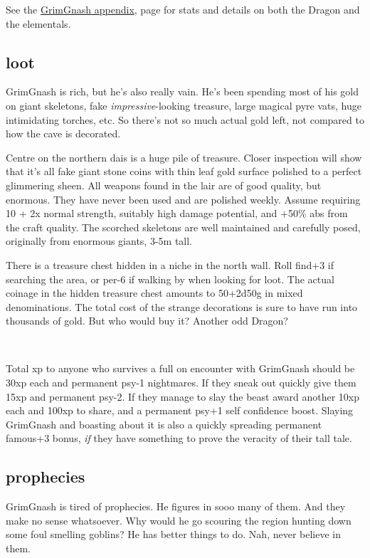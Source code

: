 See the \hyperref[appendixgrimgnash]{GrimGnash appendix}, page \pageref{appendixgrimgnash} for stats and details on both the Dragon and the elementals.


\subsection*{loot}

GrimGnash is rich, but he's also really vain. He's been spending most of his gold on giant skeletons, fake \emph{impressive}-looking treasure, large magical pyre vats, huge intimidating torches, etc. So there's not so much actual gold left, not compared to how the cave is decorated. 

Centre on the northern dais is a huge pile of treasure. Closer inspection will show that it's all fake giant stone coins with thin leaf gold surface polished to a perfect glimmering sheen.
All weapons found in the lair are of good quality, but enormous. They have never been used and are polished weekly. Assume requiring 10 + 2x normal strength, suitably high damage potential, and +50\% abs from the craft quality. The scorched skeletons are well maintained and carefully posed, originally from enormous giants, 3-5m tall.

There is a treasure chest hidden in a niche in the north wall. Roll find+3 if searching the area, or per-6 if walking by when looking for loot. The actual coinage in the hidden treasure chest amounts to 50+2d50g in mixed denominations. The total cost of the strange decorations is sure to have run into thousands of gold. But who would buy it? Another odd Dragon?

\

Total xp to anyone who survives a full on encounter with GrimGnash should be 30xp each and permanent psy-1 nightmares. If they sneak out quickly give them 15xp and permanent psy-2. If they manage to slay the beast award another 10xp each and 100xp to share, and a permanent psy+1 self confidence boost. Slaying GrimGnash and boasting about it is also a quickly spreading permanent famous+3 bonus, \emph{if} they have something to prove the veracity of their tall tale.


\subsection*{prophecies}

GrimGnash is tired of prophecies. He figures in sooo many of them. And they make no sense whatsoever. Why would he go scouring the region hunting down some foul smelling goblins? He has better things to do. Nah, never believe in them.

